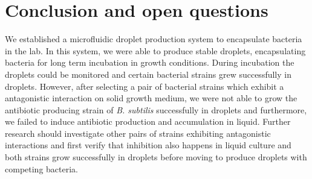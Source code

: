 \chapter{Conclusion and open questions}
\label{chap:droplets_conclusion}

We established a microfluidic droplet production system to encapsulate bacteria in the lab. In this system, we were able to produce stable droplets, encapsulating bacteria for long term incubation in growth conditions. During incubation the droplets could be monitored and certain bacterial strains grew successfully in droplets.
However, after selecting a pair of bacterial strains which exhibit a antagonistic interaction on solid growth medium, we were not able to grow the antibiotic producing strain of \textit{B. subtilis} successfully in droplets and furthermore, we failed to induce antibiotic production and accumulation in liquid.
Further research should investigate other pairs of strains exhibiting antagonistic interactions and first verify that inhibition also happens in liquid culture and both strains grow successfully in droplets before moving to produce droplets with competing bacteria.